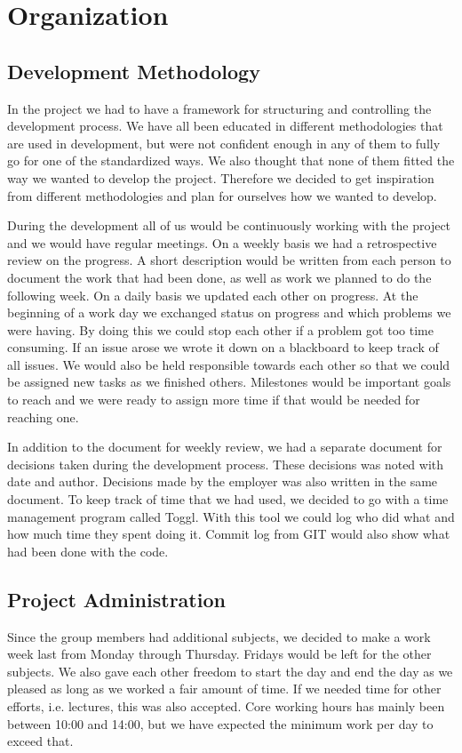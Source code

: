 \section{Organization}
\label{sec:organization}

\subsection{Development Methodology}
\label{subsec:development_methodology}
In the project we had to have a framework for structuring and controlling the
development process. We have all been educated in different methodologies that
are used in development, but were not confident enough in any of them to fully
go for one of the standardized ways. We also thought that none of them fitted 
the way we wanted to develop the project. Therefore we decided to get inspiration
from different methodologies and plan for ourselves how we wanted to develop.

During the development all of us would be continuously working with the project and we would have
regular meetings. On a weekly basis we had a retrospective review on
the progress. A short description would be written from each person to
document the work that had been done, as well as work we planned to do the
following week. On a daily basis we updated each other on progress. At
the beginning of a work day we exchanged status on progress and which
problems we were having. By doing this we could stop each other if a problem
got too time consuming. If an issue arose we wrote it down on a blackboard to keep track of all issues.
We would also be held responsible towards each other so
that we could be assigned new tasks as we finished others. Milestones would be
important goals to reach and we were ready to assign more time if that
would be needed for reaching one.

In addition to the document for weekly review, we had a separate
document for decisions taken during the development process. These decisions
was noted with date and author. Decisions made by the employer was
also written in the same document. To keep track of time that we had used,
we decided to go with a time management program called Toggl\cite{Toggl}. With this tool we
could log who did what and how much time they spent doing it. Commit log from GIT would
also show what had been done with the code.


\subsection{Project Administration}
\label{subsec:project_administration}
Since the group members had additional subjects, we decided to make a work week
last from Monday through Thursday. Fridays would be left for the other
subjects. We also gave each other freedom to start the day and end the day as
we pleased as long as we worked a fair amount of time. If we needed time for
other efforts, i.e. lectures, this was also accepted. Core working hours has
mainly been between 10:00 and 14:00, but we have expected the minimum work per
day to exceed that.

